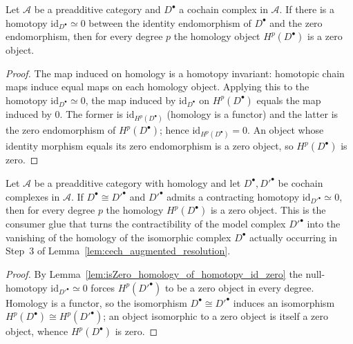 \begin{lemma}

  \label{lem:isZero_homology_of_homotopy_id_zero}
  Let \(\mathcal{A}\) be a preadditive category and \(D^\bullet\) a cochain complex in
  \(\mathcal{A}\). If there is a homotopy \(\mathrm{id}_{D^\bullet} \simeq 0\) between the
  identity endomorphism of \(D^\bullet\) and the zero endomorphism, then for every degree
  \(p\) the homology object \(H^p(D^\bullet)\) is a zero object.
\end{lemma}
\begin{proof}

\leanok
  The map induced on homology is a homotopy invariant: homotopic chain maps induce equal
  maps on each homology object. Applying this to the homotopy \(\mathrm{id}_{D^\bullet}
  \simeq 0\), the map induced by \(\mathrm{id}_{D^\bullet}\) on \(H^p(D^\bullet)\) equals the
  map induced by \(0\). The former is \(\mathrm{id}_{H^p(D^\bullet)}\) (homology is a
  functor) and the latter is the zero endomorphism of \(H^p(D^\bullet)\); hence
  \(\mathrm{id}_{H^p(D^\bullet)} = 0\). An object whose identity morphism equals its zero
  endomorphism is a zero object, so \(H^p(D^\bullet)\) is zero.
\end{proof}

\begin{lemma}

  \label{lem:isZero_homology_of_iso_homotopy_id_zero}
  Let \(\mathcal{A}\) be a preadditive category with homology and let \(D^\bullet, D'^\bullet\) be
  cochain complexes in \(\mathcal{A}\). If \(D^\bullet \cong D'^\bullet\) and \(D'^\bullet\) admits
  a contracting homotopy \(\mathrm{id}_{D'^\bullet} \simeq 0\), then for every degree \(p\) the
  homology \(H^p(D^\bullet)\) is a zero object. This is the consumer glue that turns the
  contractibility of the model complex \(D'^\bullet\) into the vanishing of the homology of the
  isomorphic complex \(D^\bullet\) actually occurring in Step~3 of
  Lemma~\ref{lem:cech_augmented_resolution}.
\end{lemma}
\begin{proof}
  \leanok
  By Lemma~\ref{lem:isZero_homology_of_homotopy_id_zero} the null-homotopy \(\mathrm{id}_{D'^\bullet}
  \simeq 0\) forces \(H^p(D'^\bullet)\) to be a zero object in every degree. Homology is a functor,
  so the isomorphism \(D^\bullet \cong D'^\bullet\) induces an isomorphism \(H^p(D^\bullet) \cong
  H^p(D'^\bullet)\); an object isomorphic to a zero object is itself a zero object, whence
  \(H^p(D^\bullet)\) is zero.
\end{proof}

